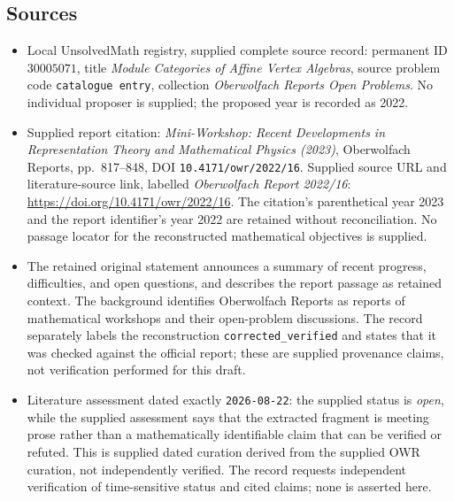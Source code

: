 \documentclass[11pt]{article}
\begin{document}
\subsection{Sources}
\begin{itemize}
\item Local UnsolvedMath registry, supplied complete source record: permanent ID \(30005071\), title \emph{Module Categories of Affine Vertex Algebras}, source problem code \texttt{catalogue entry}, collection \emph{Oberwolfach Reports Open Problems}. No individual proposer is supplied; the proposed year is recorded as 2022.
\item Supplied report citation: \emph{Mini-Workshop: Recent Developments in Representation Theory and Mathematical Physics (2023)}, Oberwolfach Reports, pp.~817--848, DOI \texttt{10.4171/owr/2022/16}. Supplied source URL and literature-source link, labelled \emph{Oberwolfach Report 2022/16}: \url{https://doi.org/10.4171/owr/2022/16}. The citation's parenthetical year 2023 and the report identifier's year 2022 are retained without reconciliation. No passage locator for the reconstructed mathematical objectives is supplied.
\item The retained original statement announces a summary of recent progress, difficulties, and open questions, and describes the report passage as retained context. The background identifies Oberwolfach Reports as reports of mathematical workshops and their open-problem discussions. The record separately labels the reconstruction \texttt{corrected\_verified} and states that it was checked against the official report; these are supplied provenance claims, not verification performed for this draft.
\item Literature assessment dated exactly \texttt{2026-08-22}: the supplied status is \emph{open}, while the supplied assessment says that the extracted fragment is meeting prose rather than a mathematically identifiable claim that can be verified or refuted. This is supplied dated curation derived from the supplied OWR curation, not independently verified. The record requests independent verification of time-sensitive status and cited claims; none is asserted here.
\end{itemize}
\end{document}
